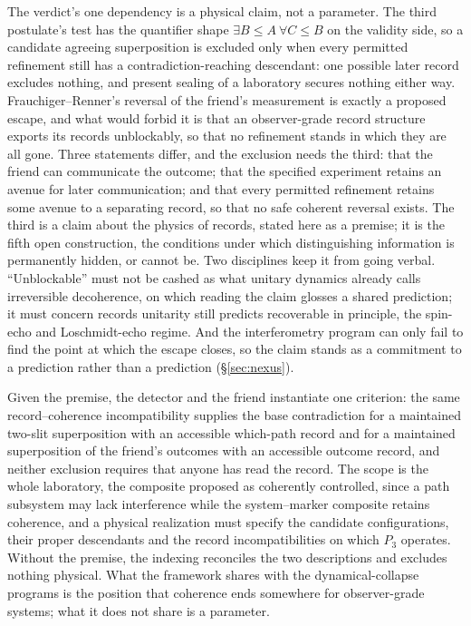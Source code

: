 \documentclass[11pt]{article}
\theoremstyle{definition}
\begin{document}
The verdict's one dependency is a physical claim, not a parameter. The third postulate's test has the quantifier shape $\exists B \le A\ \forall C \le B$ on the validity side, so a candidate agreeing superposition is excluded only when every permitted refinement still has a contradiction-reaching descendant: one possible later record excludes nothing, and present sealing of a laboratory secures nothing either way. Frauchiger--Renner's reversal of the friend's measurement is exactly a proposed escape, and what would forbid it is that an observer-grade record structure exports its records unblockably, so that no refinement stands in which they are all gone. Three statements differ, and the exclusion needs the third: that the friend can communicate the outcome; that the specified experiment retains an avenue for later communication; and that every permitted refinement retains some avenue to a separating record, so that no safe coherent reversal exists. The third is a claim about the physics of records, stated here as a premise; it is the fifth open construction, the conditions under which distinguishing information is permanently hidden, or cannot be. Two disciplines keep it from going verbal. ``Unblockable'' must not be cashed as what unitary dynamics already calls irreversible decoherence, on which reading the claim glosses a shared prediction; it must concern records unitarity still predicts recoverable in principle, the spin-echo and Loschmidt-echo regime. And the interferometry program \cite{arndt1999wave, fein2019quantum} can only fail to find the point at which the escape closes, so the claim stands as a commitment to a prediction rather than a prediction (\S\ref{sec:nexus}).

Given the premise, the detector and the friend instantiate one criterion: the same record--coherence incompatibility supplies the base contradiction for a maintained two-slit superposition with an accessible which-path record and for a maintained superposition of the friend's outcomes with an accessible outcome record, and neither exclusion requires that anyone has read the record. The scope is the whole laboratory, the composite proposed as coherently controlled, since a path subsystem may lack interference while the system--marker composite retains coherence, and a physical realization must specify the candidate configurations, their proper descendants and the record incompatibilities on which $P_3$ operates. Without the premise, the indexing reconciles the two descriptions and excludes nothing physical. What the framework shares with the dynamical-collapse programs is the position that coherence ends somewhere for observer-grade systems; what it does not share is a parameter.
\end{document}
